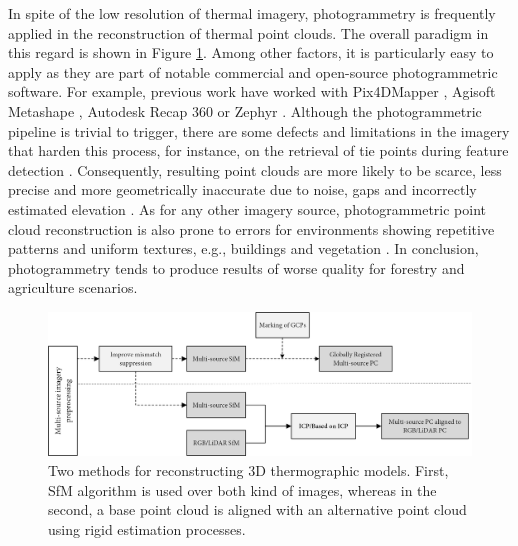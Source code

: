 In spite of the low resolution of thermal imagery, photogrammetry is frequently applied in the reconstruction of thermal point clouds. The overall paradigm in this regard is shown in Figure \ref{fig:fusion_data_01}. Among other factors, it is particularly easy to apply as they are part of notable commercial and open-source photogrammetric software. For example, previous work have worked with Pix4DMapper \cite{zheng_thermal_2020}, Agisoft Metashape \cite{grechi_3d_2021, guilbert_fusion_2020, lin_fusion_2019, macher_combination_2019}, Autodesk Recap 360 \cite{lafi_3d_2017} or Zephyr \cite{maset_photogrammetric_2017, clarkson_thermal_2017}. Although the photogrammetric pipeline is trivial to trigger, there are some defects and limitations in the imagery that harden this process, for instance, on the retrieval of tie points during feature detection \cite{lin_fusion_2019}. Consequently, resulting point clouds are more likely to be scarce, less precise and more geometrically inaccurate due to noise, gaps and incorrectly estimated elevation \cite{kong_3-d_2018}. As for any other imagery source, photogrammetric point cloud reconstruction is also prone to errors for environments showing repetitive patterns and uniform textures, e.g., buildings and vegetation \cite{lin_fusion_2019, jarzabek-rychard_supervised_2020}. In conclusion, photogrammetry tends to produce results of worse quality for forestry and agriculture scenarios.

\begin{figure}[!ht]
	\includegraphics[width=\linewidth]{figs/context/fusion_01.png}
	\caption{Two methods for reconstructing 3D thermographic models. First, SfM algorithm is used over both kind of images, whereas in the second, a base point cloud is aligned with an alternative point cloud using rigid estimation processes. }
    \label{fig:fusion_data_01}
\end{figure}

